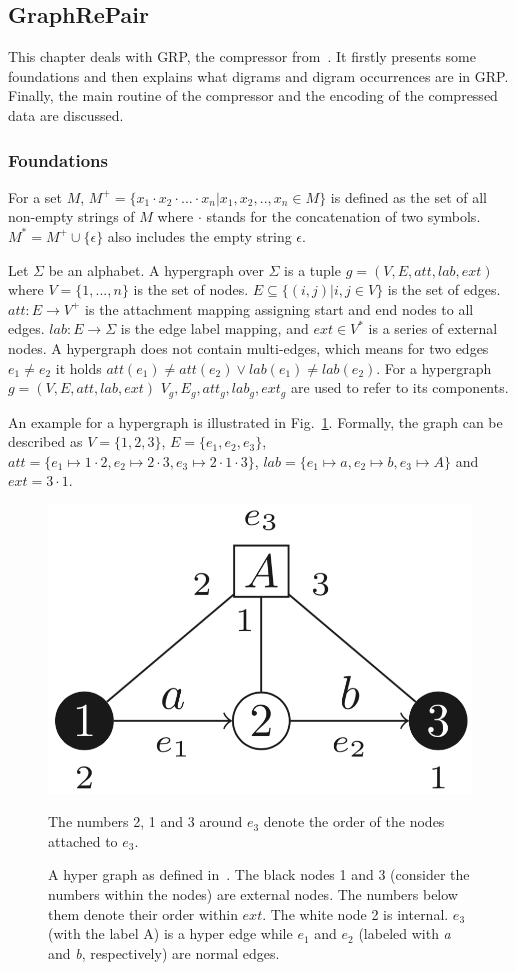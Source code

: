 \subsection{GraphRePair}\label{ch:GRP}

This chapter deals with GRP, the compressor from~\cite{maneth}. It firstly presents some foundations and then explains what digrams and digram occurrences are in GRP. Finally, the main routine of the compressor and the encoding of the compressed data are discussed.

\subsubsection{Foundations}

For a set $M$, $M^+=\{x_1 \cdot x_2 \cdot ... \cdot x_n | x_1,x_2,..,x_n \in M \}$ is defined as the set of all non-empty strings of $M$ where $\cdot$ stands for the concatenation of two symbols. $M^*=M^+ \cup \{ \epsilon \} $ also includes the empty string $\epsilon$.

Let $\Sigma$ be an alphabet. A hypergraph over $\Sigma$ is a tuple $g=(V,E,att,lab,ext)$ where $V=\{1,...,n\}$ is the set of nodes. $E \subseteq \{(i,j) | i,j\in V\} $ is the set of edges. $att: E \to V^+$ is the attachment mapping assigning start and end nodes to all edges. $lab: E\to \Sigma$ is the edge label mapping, and $ext \in V^*$ is a series of external nodes. A hypergraph does not contain multi-edges, which means for two edges $e_1\not=e_2$ it holds $att(e_1)\not=att(e_2) \vee lab(e_1)\not=lab(e_2)$. For a hypergraph $g=(V,E,att,lab,ext)$  $V_g, E_g, att_g, lab_g, ext_g$ are used to refer to its components.

An example for a hypergraph is illustrated in Fig.~\ref{fig:hypergraph}. Formally, the graph can be described as $V=\{1,2,3\}$, $E=\{e_1,e_2,e_3\}$, $att=\{e_1 \mapsto 1 \cdot 2, e_2 \mapsto2 \cdot 3, e_3 \mapsto 2 \cdot 1 \cdot 3 \}$, $lab=\{ e_1\mapsto a, e_2 \mapsto b, e_3 \mapsto A \}$ and $ext=3 \cdot 1$.

\begin{figure}
	\centering
	\includegraphics[width=0.3\linewidth]{figures/relatedwork/hypergraph}
	\caption{A hyper graph as defined in~\cite{maneth}. The black nodes 1 and 3 (consider the numbers within the nodes) are external nodes. The numbers below them denote their order within $ext$. The white node 2 is internal. $e_3$ (with the label A) is a hyper edge while $e_1$ and $e_2$ (labeled with \textit{a} and \textit{b}, respectively) are normal edges.} The numbers 2, 1 and 3 around $e_3$ denote the order of the nodes attached to $e_3$.
	\label{fig:hypergraph}
\end{figure}

